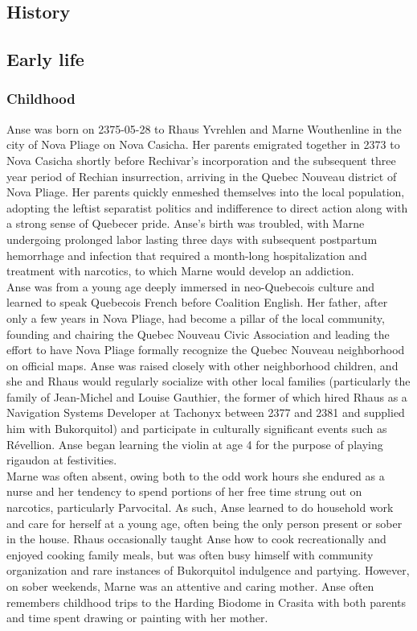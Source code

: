 \documentclass[12pt,a4paper,twocolumn]{article}
\begin{document}
	
	\begin{strip}
		\section{History}
	\end{strip}
	
	
	\subsection{Early life}
	\subsubsection{Childhood}
	\indent Anse was born on 2375-05-28 to Rhaus Yvrehlen and Marne Wouthenline in the city of Nova Pliage on Nova Casicha. Her parents emigrated together in 2373 to Nova Casicha shortly before Rechivar's incorporation and the subsequent three year period of Rechian insurrection, arriving in the Quebec Nouveau district of Nova Pliage. Her parents quickly enmeshed themselves into the local population, adopting the leftist separatist politics and indifference to direct action along with a strong sense of Quebecer pride. Anse's birth was troubled, with Marne undergoing prolonged labor lasting three days with subsequent postpartum hemorrhage and infection that required a month-long hospitalization and treatment with narcotics, to which Marne would develop an addiction.\\
	\indent Anse was from a young age deeply immersed in neo-Quebecois culture and learned to speak Quebecois French before Coalition English. Her father, after only a few years in Nova Pliage, had become a pillar of the local community, founding and chairing the Quebec Nouveau Civic Association and leading the effort to have Nova Pliage formally recognize the Quebec Nouveau neighborhood on official maps. Anse was raised closely with other neighborhood children, and she and Rhaus would regularly socialize with other local families (particularly the family of Jean-Michel and Louise Gauthier, the former of which hired Rhaus as a Navigation Systems Developer at Tachonyx between 2377 and 2381 and supplied him with Bukorquitol) and participate in culturally significant events such as Révellion. Anse began learning the violin at age 4 for the purpose of playing rigaudon at festivities.\\
	\indent Marne was often absent, owing both to the odd work hours she endured as a nurse and her tendency to spend portions of her free time strung out on narcotics, particularly Parvocital. As such, Anse learned to do household work and care for herself at a young age, often being the only person present or sober in the house. Rhaus occasionally taught Anse how to cook recreationally and enjoyed cooking family meals, but was often busy himself with community organization and rare instances of  Bukorquitol indulgence and partying. However, on sober weekends, Marne was an attentive and caring mother. Anse often remembers childhood trips to the Harding Biodome in Crasita with both parents and time spent drawing or painting with her mother.\\
\end{document}
